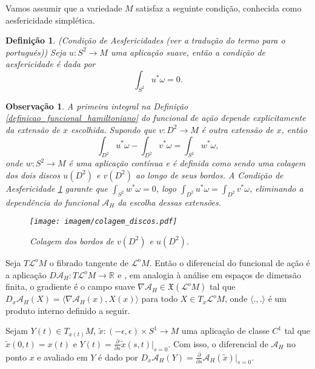 \documentclass[12pt]{book}
\newtheorem{definicao}[teorema]{Definição}
\newtheorem{observacao}[teorema]{Observação}
\newcommand{\campossuaves}[1]{\mathfrak{X}(#1)}
\newcommand{\derivadaparcial}[2]{\frac{\partial #1}{\partial #2}}
\newcommand{\espacotangenteponto}[2]{T_{#1}#2}
\newcommand{\funcionalH}{\mathcal{A}_{H}}
\newcommand{\gradientefuncional}{\nabla \funcionalH}
\newcommand{\produtointerno}[2]{\langle #1, #2 \rangle}
\newcommand{\real}[1]{\mathbb{R}^{#1}}
\newcommand{\lacocontrateis}{\mathcal{L}^{o}M}
\newcommand{\alerta}[1]{{\color{red}#1}}
\begin{document}
	Vamos assumir que a variedade $M$ satisfaz a seguinte condição, conhecida como aesfericidade simplética.
	
	\begin{definicao}\label{definicao_condicao_aesfericidade}
		(Condição de \alerta{Aesfericidades (ver a tradução do termo para o português)}) Seja $u:S^{2} \to M$ uma aplicação suave, então a condição de aesfericidade é dada por 
		$$
		\int_{S^{2}} u^{*}\omega = 0.
		$$
	\end{definicao}
	
	\begin{observacao}
		A primeira integral na Definição \ref{definicao_funcional_hamiltoniano} do funcional de ação depende explicitamente da extensão de $x$ escolhida. Supondo que $v : D^{2}\to M$ é outra extensão de $x$, então
		$$
		\int_{D^{2}}u^{*}\omega - \int_{D^{2}}v^{*}\omega  = \int_{S^{2}}w^{*}\omega, 
		$$
		onde $w:S^{2} \to M$ é uma aplicação contínua e é definida como sendo uma colagem dos dois discos $u(D^{2})$ e $v(D^{2})$ ao longo de seus bordos. A Condição de Aesfericidade \ref{definicao_condicao_aesfericidade} garante que $\int_{S^{2}}w^{*}\omega=0$, logo $\int_{D^{2}}u^{*}\omega = \int_{D^{2}}v^{*}\omega$, eliminando a dependência do funcional $\funcionalH$ da escolha dessas extensões.
		
		\begin{figure}[!h]
			\centering
			\texttt{[image: imagem/colagem\_discos.pdf]}
			\caption{Colagem dos bordos de $v(D^{2})$ e $u(D^{2})$.}
		\end{figure}
	\end{observacao}
	
	Seja $T\lacocontrateis$ o fibrado tangente de $\lacocontrateis$. Então o diferencial do funcional de ação é a aplicação $D\funcionalH: T\lacocontrateis \to \real{}$ e , em analogia à análise em espaços de dimensão finita, o gradiente é o campo suave $\gradientefuncional\in \campossuaves{\lacocontrateis}$ tal que $D_{x}\funcionalH(X) = \produtointerno{\gradientefuncional(x)}{X(x)}$ para todo $X\in \espacotangenteponto{x}{\lacocontrateis}$, onde $\produtointerno{.}{.}$ é um produto interno definido a seguir.
	
	Sejam $Y(t) \in \espacotangenteponto{x(t)}{M}$, $\tilde{x}:(-\epsilon, \epsilon)\times S^{1} \to M$  uma aplicação de classe $C^{1}$ tal que $\tilde{x}(0,t) = x(t)$ e $Y(t) = \derivadaparcial{}{s}\tilde{x}(s,t)|_{s=0}$. Com isso, o diferencial de $\funcionalH$ no ponto $x$ e avaliado em $Y$ é dado por $D_{x}\funcionalH(Y) = \derivadaparcial{}{s}\funcionalH(\tilde{x})|_{s=0}$.
	
\end{document}
